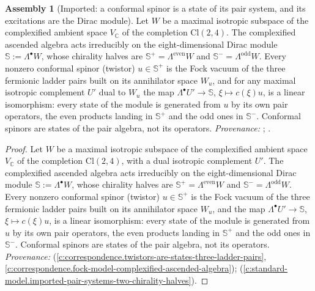 \documentclass[11pt]{article}
\theoremstyle{definition}
\newtheorem{assembled}[theorem]{Assembly}
\theoremstyle{plain}
\providecommand{\C}{}\renewcommand{\C}{\mathbb{C}}
\providecommand{\CS}{}\renewcommand{\CS}{{\mathbb{S}^{+}}}
\providecommand{\CSm}{}\renewcommand{\CSm}{{\mathbb{S}^{-}}}
\providecommand{\Cl}{}\renewcommand{\Cl}{\mathrm{Cl}}
\providecommand{\Sp}{}\renewcommand{\Sp}{\mathbb{S}}
\begin{document}
\begin{assembled}[Imported: a conformal spinor is a state of its pair system, and its excitations are the Dirac module]\label{c:lepton.imported-twistor-state-pair-system-excitations}
Let $W$ be a maximal isotropic subspace of the complexified ambient space $V_{\C}$ of the completion $\Cl(2,4)$. The complexified ascended algebra acts irreducibly on the eight-dimensional Dirac module $\Sp := \Lambda^{\bullet}W$, whose chirality halves are $\CS = \Lambda^{\mathrm{even}}W$ and $\CSm = \Lambda^{\mathrm{odd}}W$. Every nonzero conformal spinor (twistor) $u \in \CS$ is the Fock vacuum of the three fermionic ladder pairs built on its annihilator space $W_{u}$, and for any maximal isotropic complement $U'$ dual to $W_u$ the map $\Lambda^{\bullet}U' \to \Sp$, $\xi \mapsto c(\xi)u$, is a linear isomorphism: every state of the module is generated from $u$ by its own pair operators, the even products landing in $\CS$ and the odd ones in $\CSm$. Conformal spinors are states of the pair algebra, not its operators. \emph{Provenance:} \cite[Thms.~3.1, 5.3]{ButlerT9}; \cite[Fact~2.2]{ButlerT12}.
\end{assembled}
\begin{proof}
Let $W$ be a maximal isotropic subspace of the complexified ambient space $V_{\C}$ of the completion $\Cl(2,4)$, with a dual isotropic complement $U'$. The complexified ascended algebra acts irreducibly on the eight-dimensional Dirac module $\Sp := \Lambda^{\bullet}W$, whose chirality halves are $\CS = \Lambda^{\mathrm{even}}W$ and $\CSm = \Lambda^{\mathrm{odd}}W$. Every nonzero conformal spinor (twistor) $u \in \CS$ is the Fock vacuum of the three fermionic ladder pairs built on its annihilator space $W_{u}$, and the map $\Lambda^{\bullet}U' \to \Sp$, $\xi \mapsto c(\xi)u$, is a linear isomorphism: every state of the module is generated from $u$ by its own pair operators, the even products landing in $\CS$ and the odd ones in $\CSm$. Conformal spinors are states of the pair algebra, not its operators. \emph{Provenance:} \cite[Thms.~3.1, 5.3]{ButlerT9} (\ref{c:correspondence.twistors-are-states-three-ladder-pairs}, \ref{c:correspondence.fock-model-complexified-ascended-algebra}); \cite[Fact~2.2]{ButlerT12} (\ref{c:standard-model.imported-pair-systems-two-chirality-halves}).

\end{proof}
\end{document}
